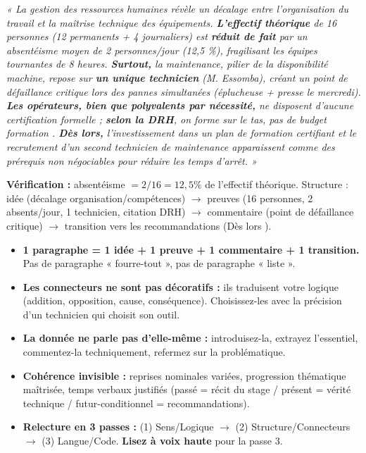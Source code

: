 \documentclass[11pt]{article}
\newcounter{popsec}
\newcounter{popsub}
\newcommand{\courssub}[1]{%
  \stepcounter{popsub}%
  \par\vspace{9pt}\noindent{\popxbold\fontsize{11.5}{13}\selectfont\color{popink}{\color{poporange}\thepopsec.\thepopsub}\hspace{6pt}#1}\par\nopagebreak\vspace{4pt}
}
\begin{document}
\begin{corrige}
\emph{« La gestion des ressources humaines révèle un décalage entre l'organisation du travail et la maîtrise technique des équipements. \textbf{L'effectif théorique} de 16 personnes (12 permanents + 4 journaliers) est \textbf{réduit de fait} par un absentéisme moyen de 2 personnes/jour (12,5 \%), fragilisant les équipes tournantes de 8 heures. \textbf{Surtout,} la maintenance, pilier de la disponibilité machine, repose sur \textbf{un unique technicien} (M. Essomba), créant un point de défaillance critique lors des pannes simultanées (éplucheuse + presse le mercredi). \textbf{Les opérateurs, bien que polyvalents par nécessité,} ne disposent d'aucune certification formelle ; \textbf{selon la DRH}, \og on forme sur le tas, pas de budget formation \fg{}. \textbf{Dès lors,} l'investissement dans un plan de formation certifiant et le recrutement d'un second technicien de maintenance apparaissent comme des prérequis non négociables pour réduire les temps d'arrêt. »}

\textbf{Vérification :} absentéisme $= 2/16 = 12,5 \%$ de l'effectif théorique. Structure : idée (décalage organisation/compétences) $\rightarrow$ preuves (16 personnes, 2 absents/jour, 1 technicien, citation DRH) $\rightarrow$ commentaire (point de défaillance critique) $\rightarrow$ transition vers les recommandations (\og Dès lors \fg{}).
\end{corrige}

\courssub{Bilan de la section}

\begin{aretenir}
\begin{itemize}
    \item \textbf{1 paragraphe = 1 idée + 1 preuve + 1 commentaire + 1 transition.} Pas de paragraphe « fourre-tout », pas de paragraphe « liste ».
    \item \textbf{Les connecteurs ne sont pas décoratifs :} ils traduisent votre logique (addition, opposition, cause, conséquence). Choisissez-les avec la précision d'un technicien qui choisit son outil.
    \item \textbf{La donnée ne parle pas d'elle-même :} introduisez-la, extrayez l'essentiel, commentez-la techniquement, refermez sur la problématique.
    \item \textbf{Cohérence invisible :} reprises nominales variées, progression thématique maîtrisée, temps verbaux justifiés (passé = récit du stage / présent = vérité technique / futur-conditionnel = recommandations).
    \item \textbf{Relecture en 3 passes :} (1) Sens/Logique $\rightarrow$ (2) Structure/Connecteurs $\rightarrow$ (3) Langue/Code. \textbf{Lisez à voix haute} pour la passe 3.
\end{itemize}
\end{aretenir}
\end{document}
